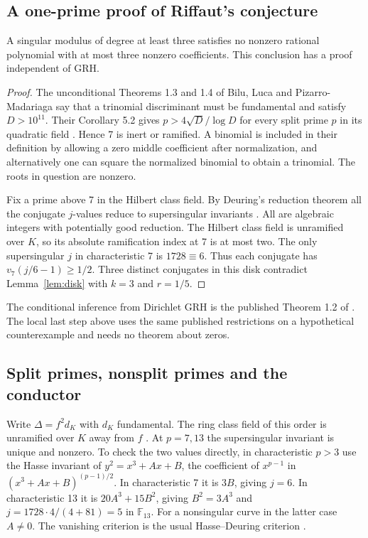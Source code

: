 \subsection{A one-prime proof of Riffaut's conjecture}
\begin{proposition}\label{prop:three}
A singular modulus of degree at least three satisfies no nonzero rational polynomial with at most three nonzero coefficients. This conclusion has a proof independent of GRH.
\end{proposition}
\begin{proof}
The unconditional Theorems 1.3 and 1.4 of Bilu, Luca and Pizarro-Madariaga say that a trinomial discriminant must be fundamental and satisfy $D>10^{11}$. Their Corollary 5.2 gives $p>4\sqrt D/\log D$ for every split prime $p$ in its quadratic field \cite{blp}. Hence 7 is inert or ramified. A binomial is included in their definition by allowing a zero middle coefficient after normalization, and alternatively one can square the normalized binomial to obtain a trinomial. The roots in question are nonzero.

Fix a prime above 7 in the Hilbert class field. By Deuring's reduction theorem all the conjugate $j$-values reduce to supersingular invariants \cite{eoy}. All are algebraic integers with potentially good reduction. The Hilbert class field is unramified over $K$, so its absolute ramification index at 7 is at most two. The only supersingular $j$ in characteristic 7 is $1728\equiv6$. Thus each conjugate has $v_7(j/6-1)\ge1/2$. Three distinct conjugates in this disk contradict Lemma~\ref{lem:disk} with $k=3$ and $r=1/5$.
\end{proof}
The conditional inference from Dirichlet GRH is the published Theorem 1.2 of \cite{blp}. The local last step above uses the same published restrictions on a hypothetical counterexample and needs no theorem about zeros.

\subsection{Split primes, nonsplit primes and the conductor}
Write $\Delta=f^2 d_K$ with $d_K$ fundamental. The ring class field of this order is unramified over $K$ away from $f$ \cite{cox}. At $p=7,13$ the supersingular invariant is unique and nonzero. To check the two values directly, in characteristic $p>3$ use the Hasse invariant of $y^2=x^3+Ax+B$, the coefficient of $x^{p-1}$ in $(x^3+Ax+B)^{(p-1)/2}$. In characteristic 7 it is $3B$, giving $j=6$. In characteristic 13 it is $20A^3+15B^2$, giving $B^2=3A^3$ and $j=1728\cdot4/(4+81)=5$ in $\mathbb F_{13}$. For a nonsingular curve in the latter case $A\ne0$. The vanishing criterion is the usual Hasse--Deuring criterion \cite{silverman}.

